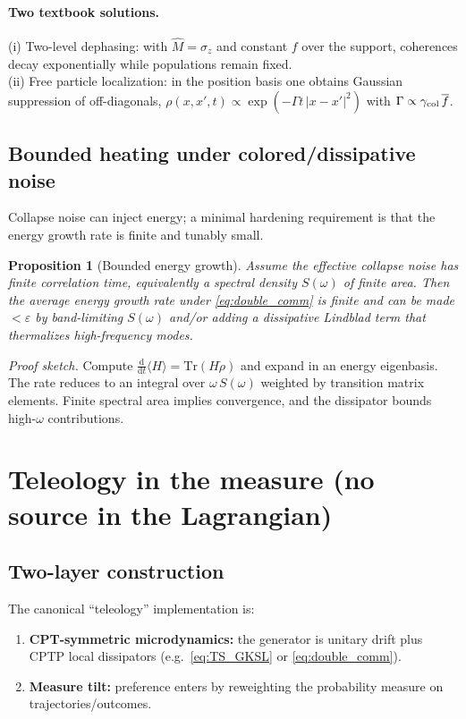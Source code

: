 \documentclass[reprint,amsmath,amssymb,aps,showkeys]{revtex4-2}
\newtheorem{proposition}{Proposition}
\theoremstyle{remark}
\newcommand{\dd}{\mathrm{d}}
\newcommand{\Tr}{\mathrm{Tr}}
\begin{document}
\paragraph{Two textbook solutions.}
(i) Two-level dephasing: with $\hat{M}=\sigma_z$ and constant $f$ over the support,
coherences decay exponentially while populations remain fixed. \\
(ii) Free particle localization: in the position basis one obtains Gaussian suppression of off-diagonals,
$\rho(x,x',t)\propto \exp(-\Gamma t\,|x-x'|^2)$ with $\Gamma\propto \gamma_{\rm col}\,\overline{f}$.

\subsection{Bounded heating under colored/dissipative noise}
Collapse noise can inject energy; a minimal hardening requirement is that the energy growth rate
is finite and tunably small.

\begin{proposition}[Bounded energy growth]
Assume the effective collapse noise has finite correlation time, equivalently a spectral density
$S(\omega)$ of finite area. Then the average energy growth rate under \eqref{eq:double_comm} is finite and can be made
$<\varepsilon$ by band-limiting $S(\omega)$ and/or adding a dissipative Lindblad term that thermalizes high-frequency modes.
\end{proposition}

\textit{Proof sketch.}
Compute $\frac{\dd}{\dd t}\langle H\rangle=\Tr(H\dot{\rho})$ and expand in an energy eigenbasis. The rate reduces to an
integral over $\omega\,S(\omega)$ weighted by transition matrix elements. Finite spectral area implies convergence,
and the dissipator bounds high-$\omega$ contributions.

\section{Teleology in the measure (no source in the Lagrangian)}
\label{sec:teleology}

\subsection{Two-layer construction}
The canonical ``teleology'' implementation is:
\begin{enumerate}[leftmargin=*,label=(\arabic*)]
\item \textbf{CPT-symmetric microdynamics:} the generator is unitary drift plus CPTP local dissipators
(e.g.\ \eqref{eq:TS_GKSL} or \eqref{eq:double_comm}).
\item \textbf{Measure tilt:} preference enters by reweighting the probability measure on trajectories/outcomes.
\end{enumerate}
\end{document}
